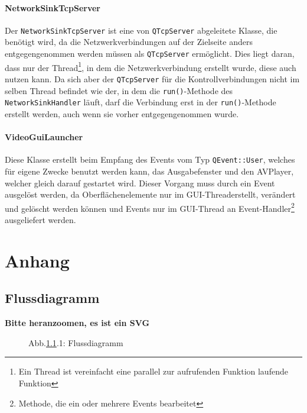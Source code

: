 \documentclass{article}
\begin{document}
    \paragraph{NetworkSinkTcpServer}
    Der \texttt{NetworkSinkTcpServer} ist eine von \texttt{QTcpServer} abgeleitete Klasse, die benötigt wird,
    da die Netzwerkverbindungen auf der Zielseite anders entgegengenommen werden müssen als \texttt{QTcpServer} ermöglicht.
    Dies liegt daran, dass nur der Thread\footnote{\label{footnoteThread}Ein Thread ist vereinfacht eine parallel zur aufrufenden Funktion laufende Funktion},
    in dem die Netzwerkverbindung erstellt wurde, diese auch nutzen kann.
    Da sich aber der \texttt{QTcpServer} für die Kontrollverbindungen nicht im selben Thread befindet wie der,
    in dem die \texttt{run()}-Methode des \texttt{NetworkSinkHandler} läuft,
    darf die Verbindung erst in der \texttt{run()}-Methode erstellt werden,
    auch wenn sie vorher entgegengenommen wurde.

    \paragraph{VideoGuiLauncher}
    Diese Klasse erstellt beim Empfang des Events vom Typ \texttt{QEvent::User}, welches für eigene Zwecke benutzt werden kann, das Ausgabefenster und den AVPlayer,
    welcher gleich darauf gestartet wird.
    Dieser Vorgang muss durch ein Event ausgelöst werden, da Oberflächenelemente nur im GUI-Thread\footnotemark[1] erstellt, verändert und gelöscht werden können und
    Events nur im GUI-Thread an Event-Handler\footnote[2]{Methode, die ein oder mehrere Events bearbeitet} ausgeliefert werden.

    \newpage


    \section{Anhang}

    \subsection{Flussdiagramm}\label{subsec:flussdiagramm}
    \textbf{Bitte heranzoomen, es ist ein SVG}
    \begin{figure}[!ht]
        \centering
        \def\svgwidth{\textwidth}
        
        \caption*{Abb.\ref{subsec:flussdiagramm}.1: Flussdiagramm}
        \label{fig:figureFlowChart}
    \end{figure}
\end{document}
